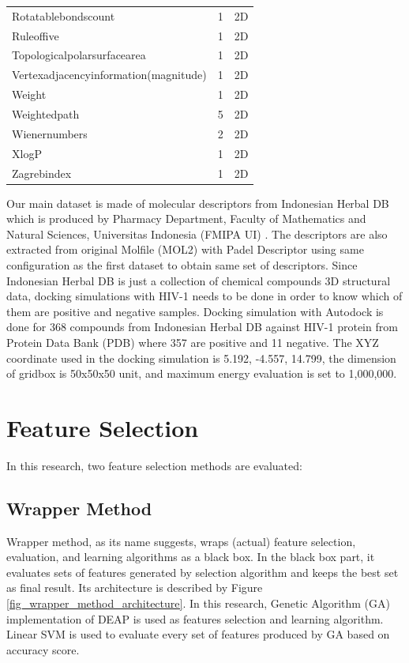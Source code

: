 \documentclass[conference,compsoc,12pt]{IEEEtran}
\begin{document}
\begin{table}
\begin{tabular}{|l|c|c|}
		Rotatablebondscount & 	1  & 2D \\
		Ruleoffive & 	1  & 2D \\
		Topologicalpolarsurfacearea & 	1  & 2D \\
		Vertexadjacencyinformation(magnitude) & 	1  & 2D \\
		Weight & 	1  & 2D \\
		Weightedpath & 	5  & 2D \\
		Wienernumbers & 	2  & 2D \\
		XlogP & 	1  & 2D \\
		Zagrebindex & 	1  & 2D \\	
		\hline 
	\end{tabular} 
	\end{table}	
	
	Our main dataset is made of molecular descriptors from Indonesian Herbal DB which is produced by Pharmacy Department, Faculty of Mathematics and Natural Sciences, Universitas Indonesia (FMIPA UI) \cite{yanuar2011medicinal}. The descriptors are also extracted from original Molfile (MOL2) with Padel Descriptor using same configuration as the first dataset to obtain same set of descriptors. Since Indonesian Herbal DB is just a collection of chemical compounds 3D structural data, docking simulations with HIV-1 needs to be done in order to know which of them are positive and negative samples. Docking simulation with Autodock is done for 368 compounds from Indonesian Herbal DB against HIV-1 protein from Protein Data Bank (PDB) where 357 are positive and 11 negative. The XYZ coordinate used in the docking simulation is 5.192, -4.557, 14.799, the dimension of gridbox is 50x50x50 unit, and maximum energy evaluation is set to 1,000,000.
	
	\section{Feature Selection} \label{Feature Selection}
	
	In this research, two feature selection methods are evaluated:

	\subsection{Wrapper Method}
	
	Wrapper method, as its name suggests, wraps (actual) feature selection, evaluation, and learning algorithms as a black box\cite{tang2014feature}. In the black box part, it evaluates sets of features generated by selection algorithm and keeps the best set as final result. Its architecture is described by Figure \ref{fig_wrapper_method_architecture}. In this research, Genetic Algorithm (GA) implementation of DEAP \cite{DEAP_JMLR2012} is used as features selection and learning algorithm. Linear SVM is used to evaluate every set of features produced by GA based on accuracy score.
	
\end{document}
